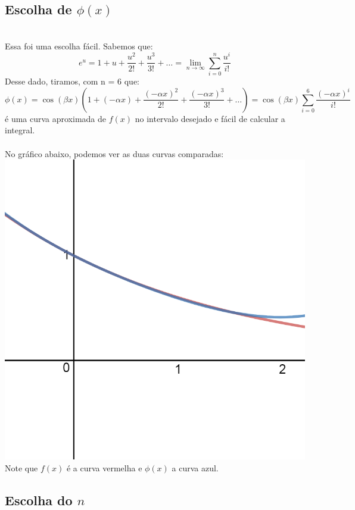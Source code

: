 \documentclass[pt12]{article}
\begin{document}
\subsection{Escolha de $\phi(x)$}
\ \\

Essa foi uma escolha fácil. Sabemos que:
$$e^u = 1 + u + \frac{u^2}{2!} +\frac{u^3}{3!} +\dots =\displaystyle{\lim_{n \to \infty} \sum_{i=0}^{n}\frac{u^i}{i!}}$$
Desse dado, tiramos, com n = 6 que:
$$\phi(x) =\cos(\beta x)\left( 1 + (-\alpha x) + \frac{(-\alpha x)^2}{2!} +\frac{(-\alpha x)^3}{3!} +\dots \right)=\cos(\beta x) \sum_{i=0}^{6}\frac{(-\alpha x)^i}{i!}$$
é uma curva aproximada de $f(x)$ no intervalo desejado e fácil de calcular a integral.\\
\ \\

No gráfico abaixo, podemos ver as duas curvas comparadas:\\
\includegraphics[scale=0.4]{desmos-graph.png}\\
Note que $f(x)$ é a curva vermelha e $\phi(x)$ a curva azul.

\subsection{Escolha do $n$}
\ \\
\end{document}
